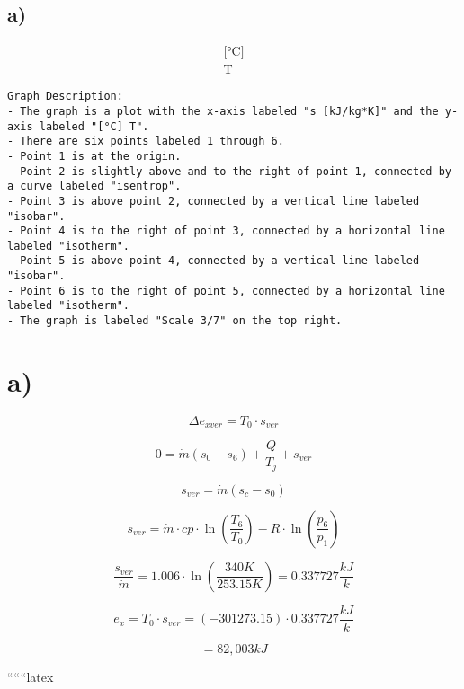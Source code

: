 

\subsection*{a)}

\[
\begin{array}{c}
\text{[°C]} \\
\text{T}
\end{array}
\]

\begin{verbatim}
Graph Description:
- The graph is a plot with the x-axis labeled "s [kJ/kg*K]" and the y-axis labeled "[°C] T".
- There are six points labeled 1 through 6.
- Point 1 is at the origin.
- Point 2 is slightly above and to the right of point 1, connected by a curve labeled "isentrop".
- Point 3 is above point 2, connected by a vertical line labeled "isobar".
- Point 4 is to the right of point 3, connected by a horizontal line labeled "isotherm".
- Point 5 is above point 4, connected by a vertical line labeled "isobar".
- Point 6 is to the right of point 5, connected by a horizontal line labeled "isotherm".
- The graph is labeled "Scale 3/7" on the top right.
\end{verbatim}



\section*{a)}

\[
\Delta e_{xver} = T_0 \cdot s_{ver}
\]

\[
0 = \dot{m} (s_0 - s_6) + \frac{Q}{T_j} + s_{ver}
\]

\[
s_{ver} = \dot{m} (s_c - s_0)
\]

\[
s_{ver} = \dot{m} \cdot cp \cdot \ln \left( \frac{T_6}{T_0} \right) - R \cdot \ln \left( \frac{p_6}{p_1} \right)
\]

\[
\frac{s_{ver}}{\dot{m}} = 1.006 \cdot \ln \left( \frac{340K}{253.15K} \right) = 0.337727 \frac{kJ}{k}
\]

\[
e_x = T_0 \cdot s_{ver} = (-301273.15) \cdot 0.337727 \frac{kJ}{k}
\]

\[
= 82,003 kJ
\]

``````latex